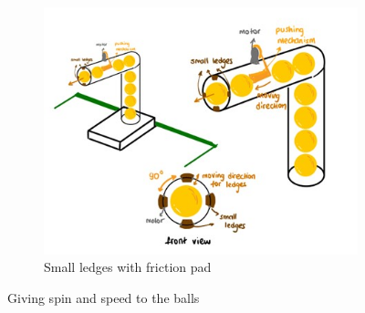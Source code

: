 \documentclass[12pt]{report}
\begin{document}
\begin{appendices}
\begin{figure}[H]
\begin{subfigure}{.5\textwidth}
  \centering
  \includegraphics[width=.4\linewidth]{Small legdes with friction pad.jpg}
  \caption{Small ledges with friction pad}
  \label{fig:ledges}
\end{subfigure}%
\begin{subfigure}{.5\textwidth}
  \centering
  
  \label{fig:spins}
\end{subfigure}%


\caption{Giving spin and speed to the balls  }
\label{fig:test}
\end{figure}


\end{appendices}
\end{document}
